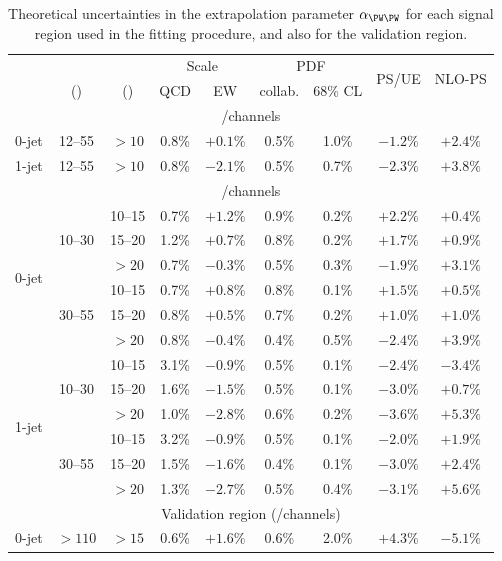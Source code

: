 \begin{table}[t]
	\centering
	\begin{tabular}{ccc|cccccc}
		\toprule
		& \mll & \ptsubleadlep & \multicolumn{2}{c}{Scale} & \multicolumn{2}{c}{PDF} & \multirow{2}{*}{PS/UE} & \multirow{2}{*}{NLO-PS} \\
		& (\GeV) & (\GeV) & QCD & EW & collab. & 68\% CL & & \\
		\midrule
		\multicolumn{9}{c}{\eech/\mmch channels} \\
		\midrule
		0-jet & 12--55 & $>10$ & 0.8\% & $+0.1\%$ & 0.5\% & 1.0\% & $-1.2\%$ & $+2.4\%$ \\
		1-jet & 12--55 & $>10$ & 0.8\% & $-2.1\%$ & 0.5\% & 0.7\% & $-2.3\%$ & $+3.8\%$ \\
		\midrule
		\multicolumn{9}{c}{\emch/\mech channels} \\
		\midrule
		\multirow{6}{*}{0-jet}
		& \multirow{3}{*}{10--30}
	    &  10--15 & 0.7\% & $+1.2\%$ & 0.9\% & 0.2\% & $+2.2\%$ & $+0.4\%$ \\
		&& 15--20 & 1.2\% & $+0.7\%$ & 0.8\% & 0.2\% & $+1.7\%$ & $+0.9\%$ \\
		&&  $>20$ & 0.7\% & $-0.3\%$ & 0.5\% & 0.3\% & $-1.9\%$ & $+3.1\%$ \\
		\cmidrule(lr){2-9}
		& \multirow{3}{*}{30--55}
		&  10--15 & 0.7\% & $+0.8\%$ & 0.8\% & 0.1\% & $+1.5\%$ & $+0.5\%$ \\
		&& 15--20 & 0.8\% & $+0.5\%$ & 0.7\% & 0.2\% & $+1.0\%$ & $+1.0\%$ \\
		&&  $>20$ & 0.8\% & $-0.4\%$ & 0.4\% & 0.5\% & $-2.4\%$ & $+3.9\%$ \\
		\cmidrule(lr){1-9}
		\multirow{6}{*}{1-jet}
		& \multirow{3}{*}{10--30}
	    &  10--15 & 3.1\% & $-0.9\%$ & 0.5\% & 0.1\% & $-2.4\%$ & $-3.4\%$ \\
		&& 15--20 & 1.6\% & $-1.5\%$ & 0.5\% & 0.1\% & $-3.0\%$ & $+0.7\%$ \\
		&&  $>20$ & 1.0\% & $-2.8\%$ & 0.6\% & 0.2\% & $-3.6\%$ & $+5.3\%$ \\
		\cmidrule(lr){2-9}
		& \multirow{3}{*}{30--55}
		&  10--15 & 3.2\% & $-0.9\%$ & 0.5\% & 0.1\% & $-2.0\%$ & $+1.9\%$ \\
		&& 15--20 & 1.5\% & $-1.6\%$ & 0.4\% & 0.1\% & $-3.0\%$ & $+2.4\%$ \\
		&&  $>20$ & 1.3\% & $-2.7\%$ & 0.5\% & 0.4\% & $-3.1\%$ & $+5.6\%$ \\
		\midrule
		\multicolumn{9}{c}{Validation region (\emch/\mech channels)} \\
		\midrule
		0-jet & $>110$ & $>15$ & 0.6\% & $+1.6\%$ & 0.6\% & 2.0\% & $+4.3\%$ & $-5.1\%$ \\
		\bottomrule
	\end{tabular}
	\caption{Theoretical uncertainties in the \WW extrapolation parameter $\alpha_{\WW}$ 
	for each signal region used in the fitting procedure, and also for the validation 
	region.}
	\label{tab:ww_bkg:alpha_unc}
\end{table}



